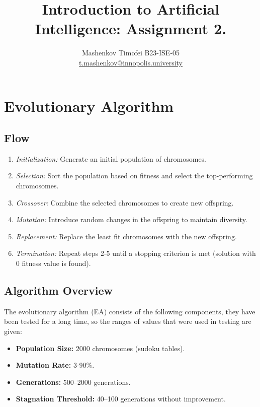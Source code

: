 \documentclass{article}
\title{Introduction to Artificial Intelligence: Assignment 2.}
\author{Mashenkov Timofei B23-ISE-05 \\ \href{mailto:t.mashenkov@innopolis.university}{t.mashenkov@innopolis.university}}
\begin{document}
\maketitle{}

\section{Evolutionary Algorithm}

\subsection{Flow}

\begin{enumerate}
  \item \textit{Initialization:} Generate an initial population of chromosomes.
  \item \textit{Selection:} Sort the population based on fitness and select the top-performing chromosomes.
  \item \textit{Crossover:} Combine the selected chromosomes to create new offspring.
  \item \textit{Mutation:} Introduce random changes in the offspring to maintain diversity.
  \item \textit{Replacement:} Replace the least fit chromosomes with the new offspring.
  \item \textit{Termination:} Repeat steps 2-5 until a stopping criterion is met (solution with 0 fitness value is found).
\end{enumerate}

\subsection{Algorithm Overview}

The evolutionary algorithm (EA) consists of the following components, they have been tested for a long time,
so the ranges of values that were used in testing are given:

\begin{itemize}
    \item \textbf{Population Size:} 2000 chromosomes (sudoku tables).
    \item \textbf{Mutation Rate:} 3-90\%.
    \item \textbf{Generations:} 500–2000 generations.
    \item \textbf{Stagnation Threshold:} 40–100 generations without improvement.
\end{itemize}
\end{document}
